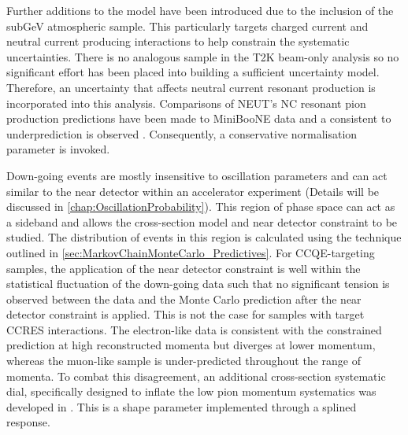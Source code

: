 Further additions to the model have been introduced due to the inclusion of the subGeV  atmospheric sample. This particularly targets charged current and neutral current  producing interactions to help constrain the systematic uncertainties. There is no analogous sample in the T2K beam-only analysis so no significant effort has been placed into building a sufficient uncertainty model. Therefore, an uncertainty that affects neutral current resonant  production is incorporated into this analysis. Comparisons of NEUT's NC resonant pion production predictions have been made to MiniBooNE \cite{MB_NC1pi0} data and a consistent  to  underprediction is observed \cite{t2k_tn_422}. Consequently, a conservative  normalisation parameter is invoked. 

Down-going events are mostly insensitive to oscillation parameters and can act similar to the near detector within an accelerator experiment (Details will be discussed in \autoref{chap:OscillationProbability}). This region of phase space can act as a sideband and allows the cross-section model and near detector constraint to be studied. The distribution of events in this region is calculated using the technique outlined in \autoref{sec:MarkovChainMonteCarlo_Predictives}. For CCQE-targeting samples, the application of the near detector constraint is well within the statistical fluctuation of the down-going data such that no significant tension is observed between the data and the Monte Carlo prediction after the near detector constraint is applied. This is not the case for samples with target CCRES interactions. The electron-like data is consistent with the constrained prediction at high reconstructed momenta but diverges at lower momentum, whereas the muon-like sample is under-predicted throughout the range of momenta. To combat this disagreement, an additional cross-section systematic dial, specifically designed to inflate the low pion momentum systematics was developed in \cite{t2k_tn_422}. This is a shape parameter implemented through a splined response. 

